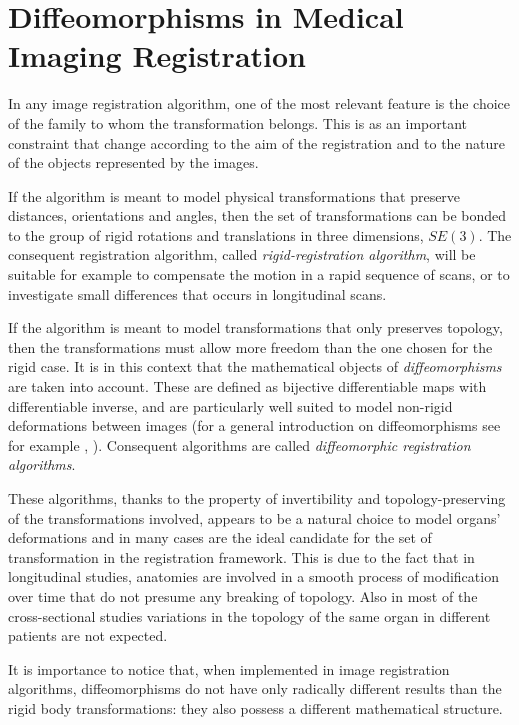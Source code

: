 \section{Diffeomorphisms in Medical Imaging Registration}

In any image registration algorithm, one of the most relevant feature is the choice of the family to whom the transformation belongs. This is as an important constraint that change according to the aim of the registration and to the nature of the objects represented by the images. 

If the algorithm is meant to model physical transformations that preserve distances, orientations and angles, then the set of transformations can be bonded to the group of rigid rotations and translations in three dimensions, $SE(3)$. The consequent registration algorithm, called \emph{rigid-registration algorithm}, will be suitable for example to compensate the motion in a rapid sequence of scans, or to investigate small differences that occurs in longitudinal scans.

If the algorithm is meant to model transformations that only preserves topology, then the transformations must allow more freedom than the one chosen for the rigid case. It is in this context that the mathematical objects of \emph{diffeomorphisms} are taken into account. These are defined as bijective differentiable maps with differentiable inverse, and are particularly well suited to model non-rigid deformations between images (for a  general introduction on diffeomorphisms see for example \cite{lee2012introduction}, \cite{arnold2006ordinary}). Consequent algorithms are called \emph{diffeomorphic registration algorithms}.

These algorithms, thanks to the property of invertibility and topology-preserving of the transformations involved, appears to be a natural choice to model organs' deformations and in many cases are the ideal candidate for the set of transformation in the registration framework. This is due to the fact that in longitudinal studies, anatomies are involved in a smooth process of modification over time that do not presume any breaking of topology. Also in most of the cross-sectional studies variations in the topology of the same organ in different patients are not expected. 

It is importance to notice that, when implemented in image registration algorithms, diffeomorphisms do not have only radically different results than the rigid body transformations: they also possess a different mathematical structure.

